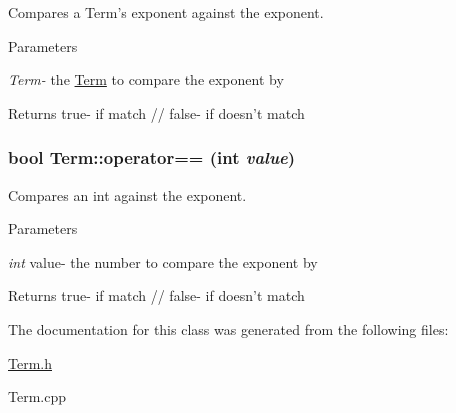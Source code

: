 Compares a Term's exponent against the exponent. 
\begin{DoxyParams}{Parameters}
\item[{\em Term-\/}]the \hyperlink{classTerm}{Term} to compare the exponent by \end{DoxyParams}
\begin{DoxyReturn}{Returns}
true-\/ if match // false-\/ if doesn't match 
\end{DoxyReturn}
\hypertarget{classTerm_a8e563a63ca972c9d2cffacb471a611a5}{
\subsubsection[{operator==}]{\setlength{\rightskip}{0pt plus 5cm}bool Term::operator== (int {\em value})}}
\label{classTerm_a8e563a63ca972c9d2cffacb471a611a5}


Compares an int against the exponent. 
\begin{DoxyParams}{Parameters}
\item[{\em int}]value-\/ the number to compare the exponent by \end{DoxyParams}
\begin{DoxyReturn}{Returns}
true-\/ if match // false-\/ if doesn't match 
\end{DoxyReturn}


The documentation for this class was generated from the following files:\begin{DoxyCompactItemize}
\item 
\hyperlink{Term_8h}{Term.h}\item 
Term.cpp\end{DoxyCompactItemize}
